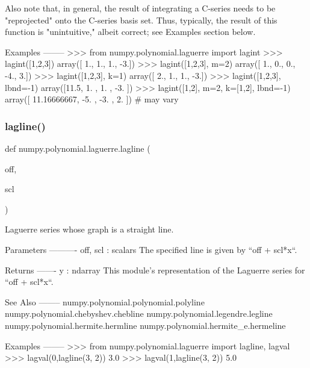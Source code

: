 \begin{DoxyVerb}
Also note that, in general, the result of integrating a C-series needs
to be "reprojected" onto the C-series basis set.  Thus, typically,
the result of this function is "unintuitive," albeit correct; see
Examples section below.

Examples
--------
>>> from numpy.polynomial.laguerre import lagint
>>> lagint([1,2,3])
array([ 1.,  1.,  1., -3.])
>>> lagint([1,2,3], m=2)
array([ 1.,  0.,  0., -4.,  3.])
>>> lagint([1,2,3], k=1)
array([ 2.,  1.,  1., -3.])
>>> lagint([1,2,3], lbnd=-1)
array([11.5,  1. ,  1. , -3. ])
>>> lagint([1,2], m=2, k=[1,2], lbnd=-1)
array([ 11.16666667,  -5.        ,  -3.        ,   2.        ]) # may vary\end{DoxyVerb}
 \mbox{\label{namespacenumpy_1_1polynomial_1_1laguerre_a49a8393e11ea9e2d688b6958a42020de}} 
\subsubsection{\texorpdfstring{lagline()}{lagline()}}
{\footnotesize\ttfamily def numpy.\+polynomial.\+laguerre.\+lagline (\begin{DoxyParamCaption}\item[{}]{off,  }\item[{}]{scl }\end{DoxyParamCaption})}

\begin{DoxyVerb}Laguerre series whose graph is a straight line.

Parameters
----------
off, scl : scalars
    The specified line is given by ``off + scl*x``.

Returns
-------
y : ndarray
    This module's representation of the Laguerre series for
    ``off + scl*x``.

See Also
--------
numpy.polynomial.polynomial.polyline
numpy.polynomial.chebyshev.chebline
numpy.polynomial.legendre.legline
numpy.polynomial.hermite.hermline
numpy.polynomial.hermite_e.hermeline

Examples
--------
>>> from numpy.polynomial.laguerre import lagline, lagval
>>> lagval(0,lagline(3, 2))
3.0
>>> lagval(1,lagline(3, 2))
5.0\end{DoxyVerb}
 \mbox{\label{namespacenumpy_1_1polynomial_1_1laguerre_a50d351bd87e0cc8e48683201b8e50bf6}} 
